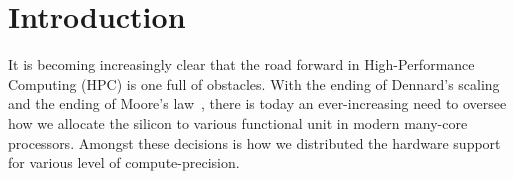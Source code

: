 \section{Introduction}\label{sec:intro}


It is becoming increasingly clear that the road forward in High-Performance Computing (HPC) is one full of obstacles.
With the ending of Dennard’s scaling~\cite{dennard_design_1974} and the ending of Moore’s law~\cite{moore_lithography_1995},
there is today an ever-increasing need to oversee how we allocate the silicon to various functional unit in modern many-core
processors. Amongst these decisions is how we distributed the hardware support for various level of compute-precision.


